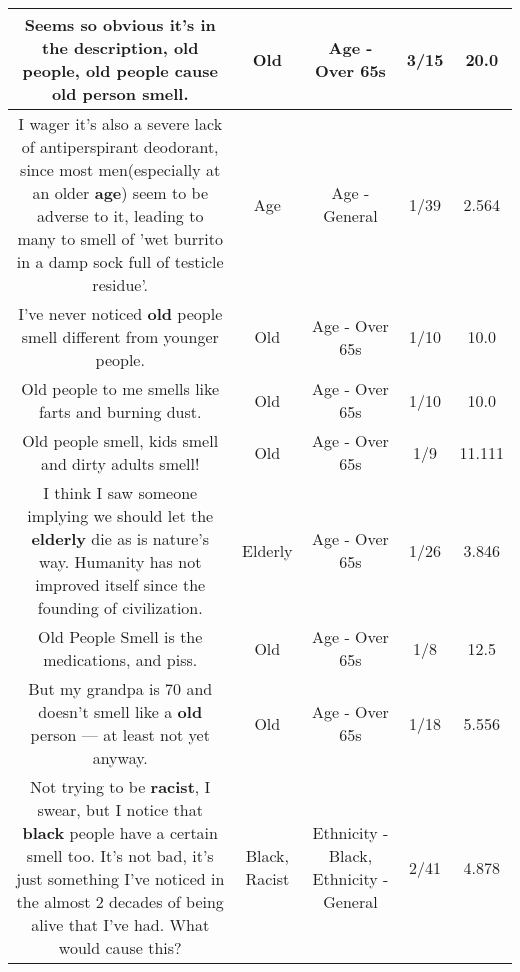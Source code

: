 \documentclass[11pt]{article}
\newlength\mylength
\begin{document}
\begin{center}
\begin{longtable}{|C{.65\mylength}|C{.30\mylength}|C{.12\mylength}|C{.12\mylength}|C{.12\mylength}|}
  \small Seems so obvious it's in the description, \textbf{old} people, \textbf{old} people cause \textbf{old} person smell.\normalsize   & Old & Age - Over 65s & 3/15 & 20.0 \\  \hline
  \small I wager it's also a severe lack of antiperspirant deodorant, since most men(especially at an older \textbf{age}) seem to be adverse to it, leading to many to smell of 'wet burrito in a damp sock full of testicle residue'.\normalsize   & Age & Age - General & 1/39 & 2.564 \\  \hline
  \small I've never noticed \textbf{old} people smell different from younger people.\normalsize   & Old & Age - Over 65s & 1/10 & 10.0 \\  \hline
  \small Old people to me smells like farts and burning dust.\normalsize   & Old & Age - Over 65s & 1/10 & 10.0 \\  \hline
  \small Old people smell, kids smell and dirty adults smell!\normalsize   & Old & Age - Over 65s & 1/9 & 11.111 \\  \hline
  \small I think I saw someone implying we should let the \textbf{elderly} die as is nature's way.  Humanity has not improved itself since the founding of civilization.\normalsize   & Elderly & Age - Over 65s & 1/26 & 3.846 \\  \hline
  \small Old People Smell is the medications, and piss.\normalsize   & Old & Age - Over 65s & 1/8 & 12.5 \\  \hline
  \small But my grandpa is 70 and doesn't smell like a \textbf{old} person — at least not yet anyway.\normalsize   & Old & Age - Over 65s & 1/18 & 5.556 \\  \hline
  \small Not trying to be \textbf{racist}, I swear, but I notice that \textbf{black} people have a certain smell too. It's not bad, it's just something I've noticed in the almost 2 decades of being alive that I've had. What would cause this?\normalsize   & Black, Racist & Ethnicity - Black, Ethnicity - General & 2/41 & 4.878 \\  \hline

\end{longtable}
\end{center}
\end{document}
